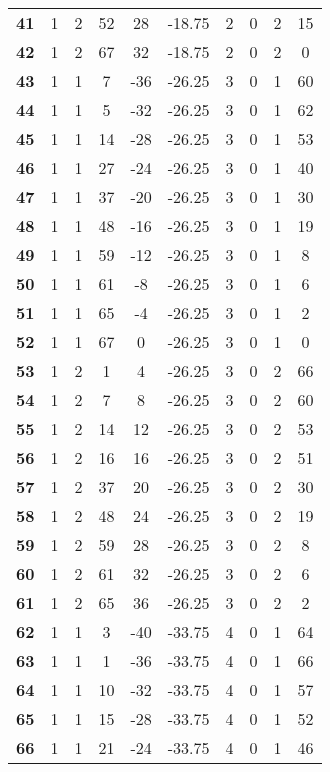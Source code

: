 \documentclass[12pt,letterpaper, onecolumn]{exam}
\begin{document}
\begin{longtable}{cccccccccc}
    \textbf{41} & 1 & 2 & 52 & 28 & -18.75 & 2 & 0 & 2 & 15 \\ 
    \textbf{42} & 1 & 2 & 67 & 32 & -18.75 & 2 & 0 & 2 & 0 \\ 
    \textbf{43} & 1 & 1 & 7 & -36 & -26.25 & 3 & 0 & 1 & 60 \\ 
    \textbf{44} & 1 & 1 & 5 & -32 & -26.25 & 3 & 0 & 1 & 62 \\ 
    \textbf{45} & 1 & 1 & 14 & -28 & -26.25 & 3 & 0 & 1 & 53 \\ 
    \textbf{46} & 1 & 1 & 27 & -24 & -26.25 & 3 & 0 & 1 & 40 \\ 
    \textbf{47} & 1 & 1 & 37 & -20 & -26.25 & 3 & 0 & 1 & 30 \\ 
    \textbf{48} & 1 & 1 & 48 & -16 & -26.25 & 3 & 0 & 1 & 19 \\ 
    \textbf{49} & 1 & 1 & 59 & -12 & -26.25 & 3 & 0 & 1 & 8 \\ 
    \textbf{50} & 1 & 1 & 61 & -8 & -26.25 & 3 & 0 & 1 & 6 \\ 
    \textbf{51} & 1 & 1 & 65 & -4 & -26.25 & 3 & 0 & 1 & 2 \\ 
    \textbf{52} & 1 & 1 & 67 & 0 & -26.25 & 3 & 0 & 1 & 0 \\ 
    \textbf{53} & 1 & 2 & 1 & 4 & -26.25 & 3 & 0 & 2 & 66 \\ 
    \textbf{54} & 1 & 2 & 7 & 8 & -26.25 & 3 & 0 & 2 & 60 \\ 
    \textbf{55} & 1 & 2 & 14 & 12 & -26.25 & 3 & 0 & 2 & 53 \\ 
    \textbf{56} & 1 & 2 & 16 & 16 & -26.25 & 3 & 0 & 2 & 51 \\ 
    \textbf{57} & 1 & 2 & 37 & 20 & -26.25 & 3 & 0 & 2 & 30 \\ 
    \textbf{58} & 1 & 2 & 48 & 24 & -26.25 & 3 & 0 & 2 & 19 \\ 
    \textbf{59} & 1 & 2 & 59 & 28 & -26.25 & 3 & 0 & 2 & 8 \\ 
    \textbf{60} & 1 & 2 & 61 & 32 & -26.25 & 3 & 0 & 2 & 6 \\ 
    \textbf{61} & 1 & 2 & 65 & 36 & -26.25 & 3 & 0 & 2 & 2 \\ 
    \textbf{62} & 1 & 1 & 3 & -40 & -33.75 & 4 & 0 & 1 & 64 \\ 
    \textbf{63} & 1 & 1 & 1 & -36 & -33.75 & 4 & 0 & 1 & 66 \\ 
    \textbf{64} & 1 & 1 & 10 & -32 & -33.75 & 4 & 0 & 1 & 57 \\ 
    \textbf{65} & 1 & 1 & 15 & -28 & -33.75 & 4 & 0 & 1 & 52 \\ 
    \textbf{66} & 1 & 1 & 21 & -24 & -33.75 & 4 & 0 & 1 & 46 \\ 

\end{longtable}
\end{document}
